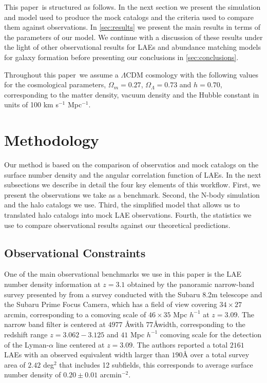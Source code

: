 \documentclass[usenatbib]{mn2e}
\newcommand{\documentname}{paper~}
\begin{document}
This \documentname is structured as follows. In the next section we present
the simulation and model used to produce the mock catalogs and the criteria
used to compare them against observations. In \SS \ref{sec:results} we
present the main results in terms of the parameters of our model. We
continue with a discussion of these results under the light of other
observational results for LAEs and abundance matching models for
galaxy formation before presenting our conclusions in \SS
\ref{sec:conclusions}. 

Throughout this \documentname we assume a $\Lambda$CDM cosmology with the
following values for the cosmological parameters, $\Omega_{m}=0.27$,
$\Omega_{\Lambda}=0.73$ and $h=0.70$, corresponding to the matter
density, vacuum density and the Hubble constant in units of 100 km
s$^{-1}$ Mpc$^{-1}$. 

\section{Methodology}

Our method is based on the comparison of observatios and mock
catalogs on the surface number density and the angular correlation
function of LAEs.  In the next subsections we describe in detail the four key
elements of this workflow. First, we present the observations we take
as a benchmark. Second, the N-body simulation and the halo catalogs we
use. Third, the simplified model that allows us to translated halo
catalogs into mock LAE observations. Fourth, the statistics we use to
compare observational results against our theoretical predictions. 

\subsection{Observational Constraints}

One of the main observational benchmarks we use in this paper is the LAE number
density information at $z=3.1$ obtained by the panoramic narrow-band
survey presented by \cite{Yamada2012} from a survey
conducted with the Subaru 8.2m telescope and the Subaru Prime Focus Camera,
which has a field of view covering $34\times 27$ arcmin, corresponding to a
comoving scale of $46\times35$ Mpc $h^{-1}$ at $z=3.09$.  The narrow
band filter is centered at $4977$ \AA with  $77$\AA width,
corresponding to the redshift range $z=3.062-3.125$ and $41$ Mpc
$h^{-1}$ comoving scale for the detection of the Lyman-$\alpha$ line
centered at $z=3.09$. The authors reported a
total  $2161$  LAEs with an observed equivalent width larger than $190$\AA 
over a total survey area of $2.42$ deg$^{2}$ that includes 12 subfields, 
this corresponds to average surface number density of $0.20\pm 0.01$ arcmin$^{-2}$.   
\end{document}
